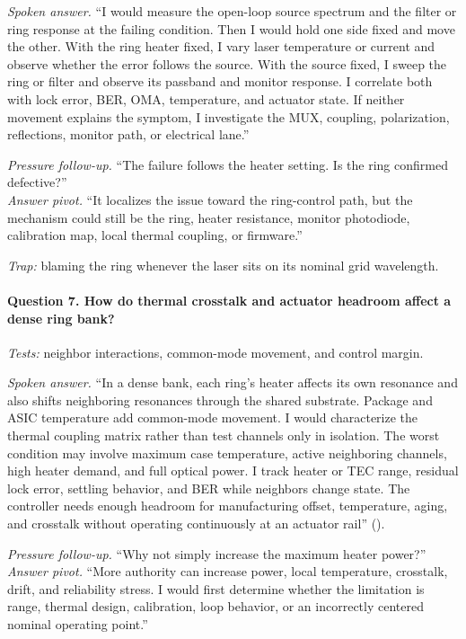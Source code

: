 \textit{Spoken answer.}
``I would measure the open-loop source spectrum and the filter or ring response
at the failing condition. Then I would hold one side fixed and move the other.
With the ring heater fixed, I vary laser temperature or current and observe
whether the error follows the source. With the source fixed, I sweep the ring or
filter and observe its passband and monitor response. I correlate both with lock
error, BER, OMA, temperature, and actuator state. If neither movement explains
the symptom, I investigate the MUX, coupling, polarization, reflections, monitor
path, or electrical lane.''

\textit{Pressure follow-up.} ``The failure follows the heater setting. Is the
ring confirmed defective?''\\
\textit{Answer pivot.} ``It localizes the issue toward the ring-control path,
but the mechanism could still be the ring, heater resistance, monitor
photodiode, calibration map, local thermal coupling, or firmware.''

\textit{Trap:} blaming the ring whenever the laser sits on its nominal grid
wavelength.

\paragraph{Question 7. How do thermal crosstalk and actuator headroom affect a
dense ring bank?}
\textit{Tests:} neighbor interactions, common-mode movement, and control margin.

\textit{Spoken answer.}
``In a dense bank, each ring's heater affects its own resonance and also shifts
neighboring resonances through the shared substrate. Package and ASIC
temperature add common-mode movement. I would characterize the thermal coupling
matrix rather than test channels only in isolation. The worst condition may
involve maximum case temperature, active neighboring channels, high heater
demand, and full optical power. I track heater or TEC range, residual lock
error, settling behavior, and BER while neighbors change state. The controller
needs enough headroom for manufacturing offset, temperature, aging, and
crosstalk without operating continuously at an actuator rail''
().

\textit{Pressure follow-up.} ``Why not simply increase the maximum heater
power?''\\
\textit{Answer pivot.} ``More authority can increase power, local temperature,
crosstalk, drift, and reliability stress. I would first determine whether the
limitation is range, thermal design, calibration, loop behavior, or an
incorrectly centered nominal operating point.''


